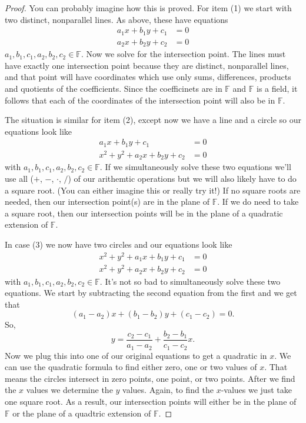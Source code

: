 \documentclass[11pt]{article}
\theoremstyle{definition}
\begin{document}
\begin{proof}
 You can probably imagine how this is proved. For item (1) we start with two distinct, nonparallel lines. As above, these have equations
 \begin{align*}
   a_1x+b_1y+c_1&=0\\
   a_2x+b_2y+c_2&=0
 \end{align*}
 $a_1,b_1,c_1,a_2,b_2,c_2\in\mathbb{F}$. Now we solve for the intersection point. The lines must have exactly one intersection point because they are
 distinct, nonparallel lines, and that point will have coordinates which use only sums, differences, products and quotients of the coefficients. Since
 the coefficinets are in $\mathbb{F}$ and $\mathbb{F}$ is a field, it follows that each of the coordinates of the intersection point will also be
 in $\mathbb{F}$.

 The situation is similar for item (2), except now we have a line and a circle so our equations look like
 \begin{align*}
   a_1x+b_1y+c_1&=0\\
   x^2 + y^2 + a_2x + b_2y +c_2 &= 0
 \end{align*}
 with $a_1,b_1,c_1,a_2,b_2,c_2\in\mathbb{F}$. If we simultaneously solve these two equations we'll use all ($+$, $-$, $\cdot$, $/$) of our arithemtic operations
 but we will also likely have to do a square root. (You can either imagine this or really try it!) If no square roots are needed, then our intersection
 point(s) are in the plane of $\mathbb{F}$. If we do need to take a square root, then our intersection points will be in the plane of a quadratic 
 extension of $\mathbb{F}$.

 In case (3) we now have two circles and our equations look like
 \begin{align*}
   x^2 + y^2 + a_1x + b_1y +c_1 &= 0\\
   x^2 + y^2 + a_2x + b_2y +c_2 &= 0
 \end{align*}
 with $a_1,b_1,c_1,a_2,b_2,c_2\in\mathbb{F}$. It's not so bad to simultaneously solve these two equations. We start by subtracting the second equation from the
 first and we get that 
 \[ (a_1-a_2)x + (b_1-b_2)y + (c_1-c_2) = 0.\]
 So, 
 \[ y = \frac{c_2-c_1}{a_1-a_2} + \frac{b_2-b_1}{c_1-c_2}x.\]
 Now we plug this into one of our original equations to get a quadratic in $x$. We can use the quadratic formula to find either zero, one or two values of $x$.
 That means the circles intersect in zero points, one point, or two points. After we find the $x$ values we determine the $y$ values. Again, to find the
 $x$-values we just take one square root. As a result, our intersection points will either be in the plane of $\mathbb{F}$ or the plane of a 
 quadtric extension of $\mathbb{F}$.
 \end{proof}
\end{document}
